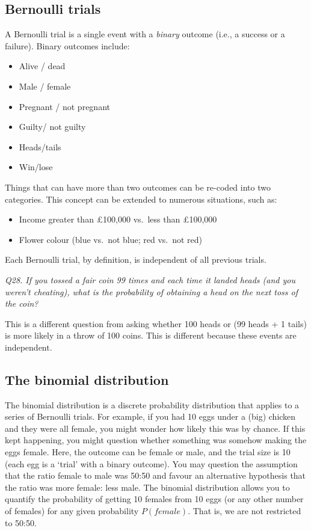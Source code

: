\documentclass[
  11pt,
  a4paper,
]{book}
\providecommand{\tightlist}{%
  \setlength{\itemsep}{0pt}\setlength{\parskip}{0pt}}
\begin{document}
\hypertarget{bernoulli-trials}{%
\subsection{Bernoulli trials}\label{bernoulli-trials}}

A Bernoulli trial is a single event with a \emph{binary} outcome (i.e., a success or a failure). Binary outcomes include:

\begin{itemize}
\tightlist
\item
  Alive / dead
\item
  Male / female
\item
  Pregnant / not pregnant
\item
  Guilty/ not guilty
\item
  Heads/tails
\item
  Win/lose
\end{itemize}

Things that can have more than two outcomes can be re-coded into two categories. This concept can be extended to numerous situations, such as:

\begin{itemize}
\tightlist
\item
  Income greater than £100,000 vs.~less than £100,000
\item
  Flower colour (blue vs.~not blue; red vs.~not red)
\end{itemize}

Each Bernoulli trial, by definition, is independent of all previous trials.

\emph{Q28. If you tossed a fair coin 99 times and each time it landed heads (and you weren't cheating), what is the probability of obtaining a head on the next toss of the coin?}

This is a different question from asking whether 100 heads or (99 heads + 1 tails) is more likely in a throw of 100 coins. This is different because these events are independent.

\hypertarget{the-binomial-distribution-1}{%
\subsection{The binomial distribution}\label{the-binomial-distribution-1}}

The binomial distribution is a discrete probability distribution that applies to a series of Bernoulli trials. For example, if you had 10 eggs under a (big) chicken and they were all female, you might wonder how likely this was by chance. If this kept happening, you might question whether something was somehow making the eggs female. Here, the outcome can be female or male, and the trial size is 10 (each egg is a `trial' with a binary outcome). You may question the assumption that the ratio female to male was 50:50 and favour an alternative hypothesis that the ratio was more female: less male. The binomial distribution allows you to quantify the probability of getting 10 females from 10 eggs (or any other number of females) for any given probability \(P(female)\). That is, we are not restricted to 50:50.
\end{document}
